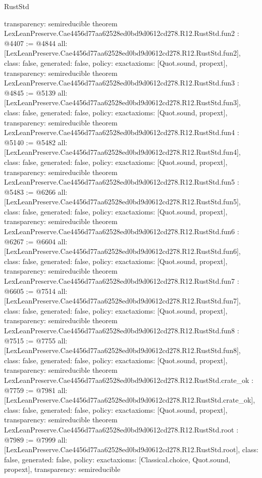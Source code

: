 \begin{lexlean}{RustStd}
\begin{coremodule}
{  transparency: semireducible
}
theorem LexLeanPreserve.Cae4456d77aa62528ed0bd9d0612cd278.R12.RustStd.fun2 : @4407 := @4844 {
  all: [LexLeanPreserve.Cae4456d77aa62528ed0bd9d0612cd278.R12.RustStd.fun2],
  class: false,
  generated: false,
  policy: exact{axioms: [Quot.sound, propext]},
  transparency: semireducible
}
theorem LexLeanPreserve.Cae4456d77aa62528ed0bd9d0612cd278.R12.RustStd.fun3 : @4845 := @5139 {
  all: [LexLeanPreserve.Cae4456d77aa62528ed0bd9d0612cd278.R12.RustStd.fun3],
  class: false,
  generated: false,
  policy: exact{axioms: [Quot.sound, propext]},
  transparency: semireducible
}
theorem LexLeanPreserve.Cae4456d77aa62528ed0bd9d0612cd278.R12.RustStd.fun4 : @5140 := @5482 {
  all: [LexLeanPreserve.Cae4456d77aa62528ed0bd9d0612cd278.R12.RustStd.fun4],
  class: false,
  generated: false,
  policy: exact{axioms: [Quot.sound, propext]},
  transparency: semireducible
}
theorem LexLeanPreserve.Cae4456d77aa62528ed0bd9d0612cd278.R12.RustStd.fun5 : @5483 := @6266 {
  all: [LexLeanPreserve.Cae4456d77aa62528ed0bd9d0612cd278.R12.RustStd.fun5],
  class: false,
  generated: false,
  policy: exact{axioms: [Quot.sound, propext]},
  transparency: semireducible
}
theorem LexLeanPreserve.Cae4456d77aa62528ed0bd9d0612cd278.R12.RustStd.fun6 : @6267 := @6604 {
  all: [LexLeanPreserve.Cae4456d77aa62528ed0bd9d0612cd278.R12.RustStd.fun6],
  class: false,
  generated: false,
  policy: exact{axioms: [Quot.sound, propext]},
  transparency: semireducible
}
theorem LexLeanPreserve.Cae4456d77aa62528ed0bd9d0612cd278.R12.RustStd.fun7 : @6605 := @7514 {
  all: [LexLeanPreserve.Cae4456d77aa62528ed0bd9d0612cd278.R12.RustStd.fun7],
  class: false,
  generated: false,
  policy: exact{axioms: [Quot.sound, propext]},
  transparency: semireducible
}
theorem LexLeanPreserve.Cae4456d77aa62528ed0bd9d0612cd278.R12.RustStd.fun8 : @7515 := @7755 {
  all: [LexLeanPreserve.Cae4456d77aa62528ed0bd9d0612cd278.R12.RustStd.fun8],
  class: false,
  generated: false,
  policy: exact{axioms: [Quot.sound, propext]},
  transparency: semireducible
}
theorem LexLeanPreserve.Cae4456d77aa62528ed0bd9d0612cd278.R12.RustStd.crate_ok : @7759 := @7981 {
  all: [LexLeanPreserve.Cae4456d77aa62528ed0bd9d0612cd278.R12.RustStd.crate_ok],
  class: false,
  generated: false,
  policy: exact{axioms: [Quot.sound, propext]},
  transparency: semireducible
}
theorem LexLeanPreserve.Cae4456d77aa62528ed0bd9d0612cd278.R12.RustStd.root : @7989 := @7999 {
  all: [LexLeanPreserve.Cae4456d77aa62528ed0bd9d0612cd278.R12.RustStd.root],
  class: false,
  generated: false,
  policy: exact{axioms: [Classical.choice, Quot.sound, propext]},
  transparency: semireducible
}


\end{coremodule}
\end{lexlean}
